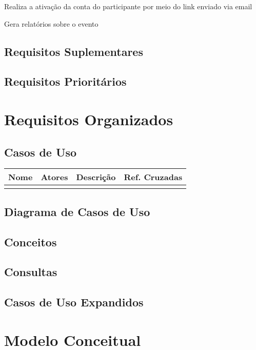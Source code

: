 \documentclass[12pt,a4paper]{article}
\begin{document}
				{Realiza a ativação da conta do participante por meio do link enviado via email}
				{%
				
				}

				{Gera relatórios sobre o evento}
				{%
				
				}

        	\clearpage
        	\subsection{Requisitos Suplementares}
        	
        	\subsection{Requisitos Prioritários}
        	
        	\clearpage
        	\section{Requisitos Organizados}
	        	\subsection{Casos de Uso}
	        	
	        		\begin{tabular}{|l|l|l|l|}
	        		\hline Nome & Atores & Descrição & Ref. Cruzadas \\ 
	        		\hline  &  &  &  \\ 
	        		\hline 
	        		\end{tabular} 
	        		
	        	\subsection{Diagrama de Casos de Uso}
	        	\subsection{Conceitos}
	        	\subsection{Consultas}
	        	\subsection{Casos de Uso Expandidos}
        	
        	\clearpage
        	\section{Modelo Conceitual}
        	
			
\end{document}
